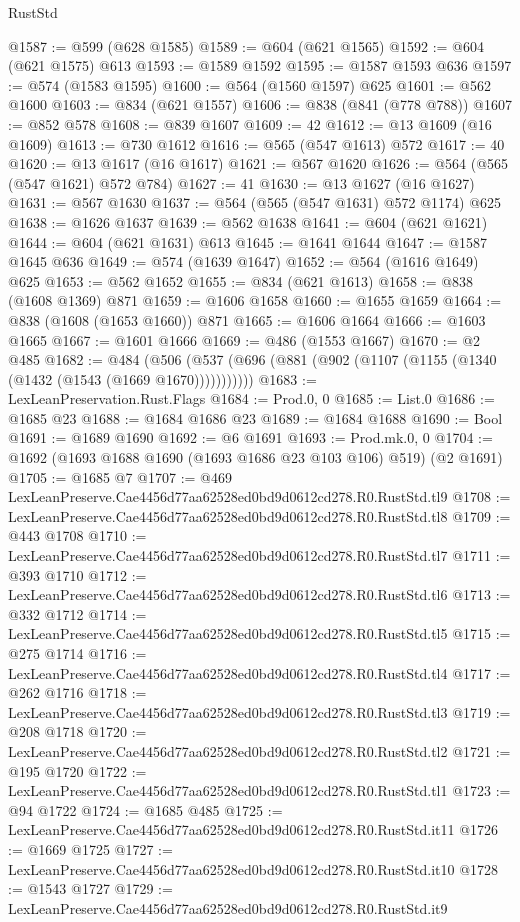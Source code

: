 \begin{lexlean}{RustStd}
\begin{coremodule}
@1587 := @599 (@628 @1585)
@1589 := @604 (@621 @1565)
@1592 := @604 (@621 @1575) @613
@1593 := @1589 @1592
@1595 := @1587 @1593 @636
@1597 := @574 (@1583 @1595)
@1600 := @564 (@1560 @1597) @625
@1601 := @562 @1600
@1603 := @834 (@621 @1557)
@1606 := @838 (@841 (@778 @788))
@1607 := @852 @578
@1608 := @839 @1607
@1609 := 42
@1612 := @13 @1609 (@16 @1609)
@1613 := @730 @1612
@1616 := @565 (@547 @1613) @572
@1617 := 40
@1620 := @13 @1617 (@16 @1617)
@1621 := @567 @1620
@1626 := @564 (@565 (@547 @1621) @572 @784)
@1627 := 41
@1630 := @13 @1627 (@16 @1627)
@1631 := @567 @1630
@1637 := @564 (@565 (@547 @1631) @572 @1174) @625
@1638 := @1626 @1637
@1639 := @562 @1638
@1641 := @604 (@621 @1621)
@1644 := @604 (@621 @1631) @613
@1645 := @1641 @1644
@1647 := @1587 @1645 @636
@1649 := @574 (@1639 @1647)
@1652 := @564 (@1616 @1649) @625
@1653 := @562 @1652
@1655 := @834 (@621 @1613)
@1658 := @838 (@1608 @1369) @871
@1659 := @1606 @1658
@1660 := @1655 @1659
@1664 := @838 (@1608 (@1653 @1660)) @871
@1665 := @1606 @1664
@1666 := @1603 @1665
@1667 := @1601 @1666
@1669 := @486 (@1553 @1667)
@1670 := @2 @485
@1682 := @484
    (@506 (@537 (@696 (@881 (@902 (@1107 (@1155 (@1340 (@1432 (@1543 (@1669 @1670)))))))))))
@1683 := LexLeanPreservation.Rust.Flags
@1684 := Prod.{0, 0}
@1685 := List.{0}
@1686 := @1685 @23
@1688 := @1684 @1686 @23
@1689 := @1684 @1688
@1690 := Bool
@1691 := @1689 @1690
@1692 := @6 @1691
@1693 := Prod.mk.{0, 0}
@1704 := @1692 (@1693 @1688 @1690 (@1693 @1686 @23 @103 @106) @519) (@2 @1691)
@1705 := @1685 @7
@1707 := @469 LexLeanPreserve.Cae4456d77aa62528ed0bd9d0612cd278.R0.RustStd.tl9
@1708 := LexLeanPreserve.Cae4456d77aa62528ed0bd9d0612cd278.R0.RustStd.tl8
@1709 := @443 @1708
@1710 := LexLeanPreserve.Cae4456d77aa62528ed0bd9d0612cd278.R0.RustStd.tl7
@1711 := @393 @1710
@1712 := LexLeanPreserve.Cae4456d77aa62528ed0bd9d0612cd278.R0.RustStd.tl6
@1713 := @332 @1712
@1714 := LexLeanPreserve.Cae4456d77aa62528ed0bd9d0612cd278.R0.RustStd.tl5
@1715 := @275 @1714
@1716 := LexLeanPreserve.Cae4456d77aa62528ed0bd9d0612cd278.R0.RustStd.tl4
@1717 := @262 @1716
@1718 := LexLeanPreserve.Cae4456d77aa62528ed0bd9d0612cd278.R0.RustStd.tl3
@1719 := @208 @1718
@1720 := LexLeanPreserve.Cae4456d77aa62528ed0bd9d0612cd278.R0.RustStd.tl2
@1721 := @195 @1720
@1722 := LexLeanPreserve.Cae4456d77aa62528ed0bd9d0612cd278.R0.RustStd.tl1
@1723 := @94 @1722
@1724 := @1685 @485
@1725 := LexLeanPreserve.Cae4456d77aa62528ed0bd9d0612cd278.R0.RustStd.it11
@1726 := @1669 @1725
@1727 := LexLeanPreserve.Cae4456d77aa62528ed0bd9d0612cd278.R0.RustStd.it10
@1728 := @1543 @1727
@1729 := LexLeanPreserve.Cae4456d77aa62528ed0bd9d0612cd278.R0.RustStd.it9

\end{coremodule}
\end{lexlean}
